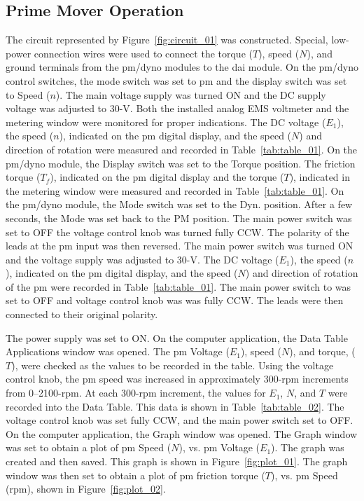 \documentclass{article}
\begin{document}
\subsection{Prime Mover Operation}

\label{part1} The circuit represented by Figure~\ref{fig:circuit_01} was
constructed. Special, low-power connection wires were used to connect the
torque ($T$), speed ($N$), and ground terminals from the \gls{pm}/\gls{dyno}
modules to the \gls{dai} module. On the \gls{pm}/\gls{dyno} control switches,
the mode switch was set to \gls{pm} and the display switch was set to Speed
($n$). The main voltage supply was turned ON and the DC supply voltage was
adjusted to 30-V. Both the installed analog EMS voltmeter and the metering
window were monitored for proper indications. The DC voltage ($E_1$), the speed
($n$), indicated on the \gls{pm} digital display, and the speed ($N$) and
direction of rotation were measured and recorded in Table~\ref{tab:table_01}.
On the \gls{pm}/\gls{dyno} module, the Display switch was set to the Torque
position. The friction torque ($T_f$), indicated on the \gls{pm} digital
display and the torque ($T$), indicated in the metering window were measured
and recorded in Table~\ref{tab:table_01}.  On the \gls{pm}/\gls{dyno} module,
the Mode switch was set to the {Dyn}. position.  After a few seconds, the Mode
was set back to the PM position. The main power switch was set to OFF the
voltage control knob was turned fully {CCW}. The polarity of the leads at the
\gls{pm} input was then reversed. The main power switch was turned ON and the
voltage supply was adjusted to 30-V. The DC voltage ($E_1$), the speed ($n$),
indicated on the \gls{pm} digital display, and the speed ($N$) and direction of
rotation of the \gls{pm} were recorded in Table~\ref{tab:table_01}. The main
power switch to was set to {OFF} and voltage control knob was was fully {CCW}.
The leads were then connected to their original polarity.

The power supply was set to {ON}. On the computer application, the Data Table
Applications window was opened. The \gls{pm} Voltage ($E_1$), speed ($N$), and
torque, ($T$), were checked as the values to be recorded in the table. Using
the voltage control knob, the \gls{pm} speed was increased in approximately
300-rpm increments from 0--2100-rpm. At each 300-rpm increment, the values for
$E_1$, $N$, and $T$ were recorded into the Data Table. This data is shown in
Table~\ref{tab:table_02}. The voltage control knob was set fully CCW, and the
main power switch set to {OFF}. On the computer application, the Graph window
was opened. The Graph window was set to obtain a plot of \gls{pm} Speed ($N$),
vs. \gls{pm} Voltage ($E_1$). The graph was created and then saved.  This graph
is shown in Figure~\ref{fig:plot_01}. The graph window was then set to obtain a
plot of \gls{pm} friction torque ($T$), vs. \gls{pm} Speed (rpm), shown in
Figure~\ref{fig:plot_02}.
\end{document}
